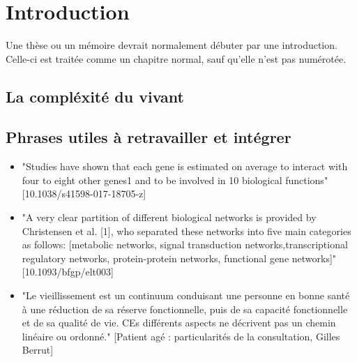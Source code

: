 \chapter*{Introduction}         %

Une thèse ou un mémoire devrait normalement débuter par une
introduction. Celle-ci est traitée comme un chapitre normal, sauf
qu'elle n'est pas numérotée.

\section{La compléxité du vivant}



\section*{Phrases utiles à retravailler et intégrer}

\begin{itemize}
\item "Studies have shown that each gene is estimated on average to interact with four to eight other genes1 and to be involved in 10 biological functions" [10.1038/s41598-017-18705-z]
\item "A very clear partition of different biological networks is provided by Christensen et al. [1], who separated these networks into five main categories as follows: [metabolic networks, signal transduction networks,transcriptional regulatory networks, protein-protein networks, functional gene networks]" [10.1093/bfgp/elt003]
\item "Le vieillissement est un continuum conduisant une personne en bonne santé à une réduction de sa réserve fonctionnelle, puis de sa capacité fonctionnelle et de sa qualité de vie. CEs différents aspects ne décrivent pas un chemin linéaire ou ordonné." [Patient agé : particularités de la consultation, Gilles Berrut]
\end{itemize}





